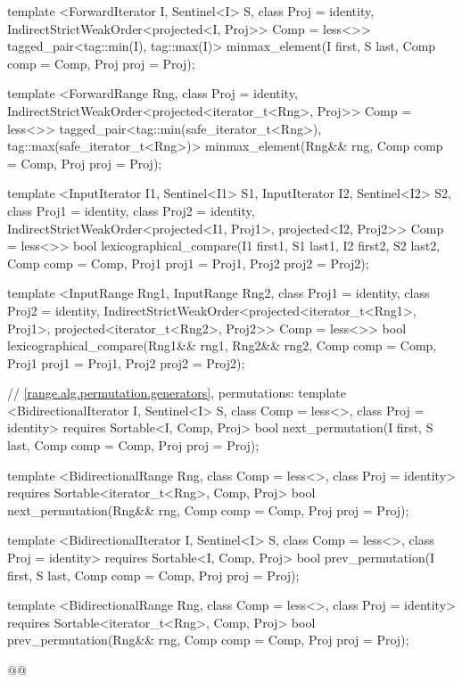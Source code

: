 {\begin{codeblock}
{{    template <ForwardIterator I, Sentinel<I> S, class Proj = identity,
        IndirectStrictWeakOrder<projected<I, Proj>> Comp = less<>>
      tagged_pair<tag::min(I), tag::max(I)>
        minmax_element(I first, S last, Comp comp = Comp{}, Proj proj = Proj{});

    template <ForwardRange Rng, class Proj = identity,
        IndirectStrictWeakOrder<projected<iterator_t<Rng>, Proj>> Comp = less<>>
      tagged_pair<tag::min(safe_iterator_t<Rng>),
                  tag::max(safe_iterator_t<Rng>)>
        minmax_element(Rng&& rng, Comp comp = Comp{}, Proj proj = Proj{});

    template <InputIterator I1, Sentinel<I1> S1, InputIterator I2, Sentinel<I2> S2,
        class Proj1 = identity, class Proj2 = identity,
        IndirectStrictWeakOrder<projected<I1, Proj1>, projected<I2, Proj2>> Comp = less<>>
      bool
        lexicographical_compare(I1 first1, S1 last1, I2 first2, S2 last2,
                                Comp comp = Comp{}, Proj1 proj1 = Proj1{}, Proj2 proj2 = Proj2{});

    template <InputRange Rng1, InputRange Rng2, class Proj1 = identity,
        class Proj2 = identity,
        IndirectStrictWeakOrder<projected<iterator_t<Rng1>, Proj1>,
          projected<iterator_t<Rng2>, Proj2>> Comp = less<>>
      bool
        lexicographical_compare(Rng1&& rng1, Rng2&& rng2, Comp comp = Comp{},
                                Proj1 proj1 = Proj1{}, Proj2 proj2 = Proj2{});

    // \ref{range.alg.permutation.generators}, permutations:
    template <BidirectionalIterator I, Sentinel<I> S, class Comp = less<>,
        class Proj = identity>
      requires Sortable<I, Comp, Proj>
      bool next_permutation(I first, S last, Comp comp = Comp{}, Proj proj = Proj{});

    template <BidirectionalRange Rng, class Comp = less<>,
        class Proj = identity>
      requires Sortable<iterator_t<Rng>, Comp, Proj>
      bool next_permutation(Rng&& rng, Comp comp = Comp{}, Proj proj = Proj{});

    template <BidirectionalIterator I, Sentinel<I> S, class Comp = less<>,
        class Proj = identity>
      requires Sortable<I, Comp, Proj>
      bool prev_permutation(I first, S last, Comp comp = Comp{}, Proj proj = Proj{});

    template <BidirectionalRange Rng, class Comp = less<>,
        class Proj = identity>
      requires Sortable<iterator_t<Rng>, Comp, Proj>
      bool prev_permutation(Rng&& rng, Comp comp = Comp{}, Proj proj = Proj{});
  }
}@\oldtxt{\}\}}@
\end{codeblock}

}

